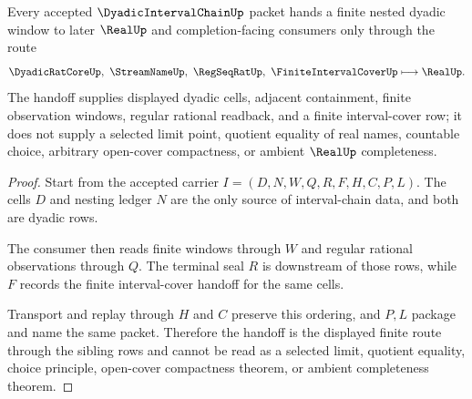 \begin{theorem}
\label{thm:dyadic-interval-chain-nesting-handoff}
Every accepted $\DyadicIntervalChainUp$ packet hands a finite nested dyadic window to later $\RealUp$ and completion-facing consumers only through the route
$$
\DyadicRatCoreUp,\ \StreamNameUp,\ \RegSeqRatUp,\ \FiniteIntervalCoverUp \longmapsto \RealUp .
$$
The handoff supplies displayed dyadic cells, adjacent containment, finite observation windows, regular rational readback, and a finite interval-cover row; it does not supply a selected limit point, quotient equality of real names, countable choice, arbitrary open-cover compactness, or ambient $\RealUp$ completeness.
\end{theorem}
\begin{proof}
Start from the accepted carrier $I=(D,N,W,Q,R,F,H,C,P,L)$. The cells $D$ and nesting ledger $N$ are the only source of interval-chain data, and both are dyadic rows.

The consumer then reads finite windows through $W$ and regular rational observations through $Q$. The terminal seal $R$ is downstream of those rows, while $F$ records the finite interval-cover handoff for the same cells.

Transport and replay through $H$ and $C$ preserve this ordering, and $P,L$ package and name the same packet. Therefore the handoff is the displayed finite route through the sibling rows and cannot be read as a selected limit, quotient equality, choice principle, open-cover compactness theorem, or ambient completeness theorem.
\end{proof}




